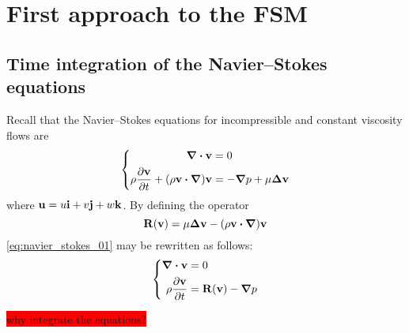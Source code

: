 
\section{First approach to the FSM}

\subsection{Time integration of the Navier--Stokes equations}

Recall that the Navier--Stokes equations for incompressible and constant viscosity flows are
\begin{equation} \label{eq:navier_stokes_01}
    \left\{
    \begin{aligned}
        \div{\vb{v}} &= 0 \\
        \rho \pdv{\vb{v}}{t} + (\rho \vb{v} \vdot \grad) \vb{v} &= -\grad{p} + \mu \laplacian{\vb{v}}
    \end{aligned}
    \right.
\end{equation}
where $\vb{u} = u \vb{i} + v \vb{j} + w \vb{k}$. By defining the operator
\begin{equation}
    \vb{R}(\vb{v}) = \mu \laplacian{\vb{v}} - (\rho \vb{v} \vdot \grad) \vb{v}
\end{equation}
\eqref{eq:navier_stokes_01} may be rewritten as follows:
\begin{equation} \label{eq:navier_stokes_02}
    \left\{
    \begin{aligned}
        \div{\vb{v}} &= 0 \\
        \rho \pdv{\vb{v}}{t} &= \vb{R}(\vb{v}) - \grad{p}
    \end{aligned}
    \right.
\end{equation}

\colorbox{red}{why integrate the equations?}


